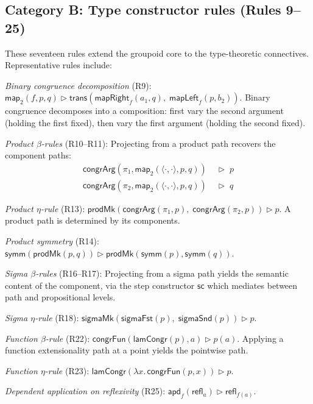 \documentclass[manuscript]{BSLstyle}
\newcommand{\refl}{\mathsf{refl}}
\newcommand{\symm}{\mathsf{symm}}
\newcommand{\trans}{\mathsf{trans}}
\newcommand{\congrArg}{\mathsf{congrArg}}
\newcommand{\congrFun}{\mathsf{congrFun}}
\newcommand{\apd}{\mathsf{apd}}
\begin{document}
\subsection{Category B: Type constructor rules (Rules 9--25)}\label{ssec:cat-B}

These seventeen rules extend the groupoid core to the type-theoretic
connectives. Representative rules include:

\emph{Binary congruence decomposition} (R9):
$\mathsf{map}_2(f, p, q) \triangleright
  \trans(\mathsf{mapRight}_f(a_1, q),\; \mathsf{mapLeft}_f(p, b_2))$.
Binary congruence decomposes into a composition: first vary the second
argument (holding the first fixed), then vary the first argument
(holding the second fixed).

\emph{Product $\beta$-rules} (R10--R11): Projecting from a product path
recovers the component paths:
\begin{align*}
\congrArg(\pi_1, \mathsf{map}_2(\langle{\cdot},{\cdot}\rangle, p, q))
  &\;\triangleright\; p \tag{R10} \\
\congrArg(\pi_2, \mathsf{map}_2(\langle{\cdot},{\cdot}\rangle, p, q))
  &\;\triangleright\; q \tag{R11}
\end{align*}

\emph{Product $\eta$-rule} (R13):
$\mathsf{prodMk}(\congrArg(\pi_1, p),\; \congrArg(\pi_2, p))
  \triangleright p$.
A product path is determined by its components.

\emph{Product symmetry} (R14):
$\symm(\mathsf{prodMk}(p, q)) \triangleright
  \mathsf{prodMk}(\symm(p), \symm(q))$.

\emph{Sigma $\beta$-rules} (R16--R17): Projecting from a sigma path
yields the semantic content of the component, via the step constructor
$\mathsf{sc}$ which mediates between path and propositional levels.

\emph{Sigma $\eta$-rule} (R18):
$\mathsf{sigmaMk}(\mathsf{sigmaFst}(p),\; \mathsf{sigmaSnd}(p))
  \triangleright p$.

\emph{Function $\beta$-rule} (R22):
$\congrFun(\mathsf{lamCongr}(p), a) \triangleright p(a)$.
Applying a function extensionality path at a point yields the
pointwise path.

\emph{Function $\eta$-rule} (R23):
$\mathsf{lamCongr}(\lambda x.\, \congrFun(p, x)) \triangleright p$.

\emph{Dependent application on reflexivity} (R25):
$\apd_f(\refl_a) \triangleright \refl_{f(a)}$.
\end{document}
